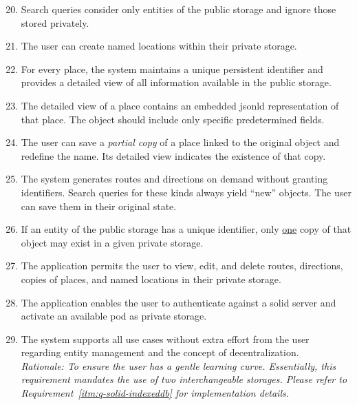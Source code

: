 \begin{enumerate}[label=\textbf{F\arabic*}]\setcounter{enumi}{19}
\item\label{itm:f-entity-management-search} Search queries consider only entities of the public storage and ignore those stored privately.
\item\label{itm:f-entity-management-named-loc} The user can create named locations within their private storage.
\item\label{itm:f-entity-management-unique-places} For every place, the system maintains a unique persistent identifier and provides a detailed view of all information available in the public storage.
\item\label{itm:f-entity-management-jsonld} The detailed view of a place contains an embedded \acs{jsonld} representation of that place. The object should include only specific predetermined fields.
\item\label{itm:f-entity-management-partial-copy} The user can save a \emph{partial copy} of a place linked to the original object and redefine the name. Its detailed view indicates the existence of that copy.
\item\label{itm:f-entity-management-gen-traversals} The system generates routes and directions on demand without granting identifiers. Search queries for these kinds always yield ``new'' objects. The user can save them in their original state.
\item\label{itm:f-entity-management-unique-copy} If an entity of the public storage has a unique identifier, only \underline{one} copy of that object may exist in a given private storage.
\item\label{itm:f-entity-management-favorites} The application permits the user to view, edit, and delete routes, directions, copies of places, and named locations in their private storage.
\item\label{itm:f-entity-management-solid} The application enables the user to authenticate against a \acs{solid} server and activate an available pod as private storage.
\item\label{itm:f-entity-management-usable} The system supports all use cases without extra effort from the user regarding entity management and the concept of decentralization.\\[0.3em]
\emph{Rationale: To ensure the user has a gentle learning curve. Essentially, this requirement mandates the use of two interchangeable storages. Please refer to Requirement~\ref{itm:q-solid-indexeddb} for implementation details.}
\end{enumerate}

